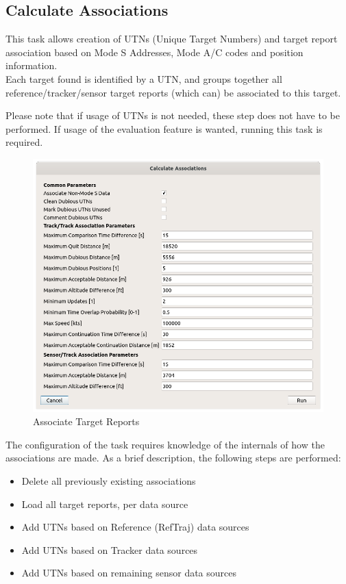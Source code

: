 \subsection{Calculate Associations}
\label{sec:task_associate_tr}

This task allows creation of UTNs (Unique Target Numbers) and target report association based on Mode S Addresses, Mode A/C codes and position information. \\

Each target found is identified by a UTN, and groups together all reference/tracker/sensor target reports (which can) be associated to this target.

Please note that if usage of UTNs is not needed, these step does not have to be performed. If usage of the evaluation feature is wanted, running this task is required. \\

\begin{figure}[H]
  \center
    \includegraphics[width=16cm]{figures/tr_association_config.png}
  \caption{Associate Target Reports}
\end{figure}

The configuration of the task requires knowledge of the internals of how the associations are made. As a brief description, the following steps are performed:

\begin{itemize}
\item Delete all previously existing associations
\item Load all target reports, per data source
\item Add UTNs based on Reference (RefTraj) data sources
\item Add UTNs based on Tracker data sources
\item Add UTNs based on remaining sensor data sources
\end{itemize}
\ \\

